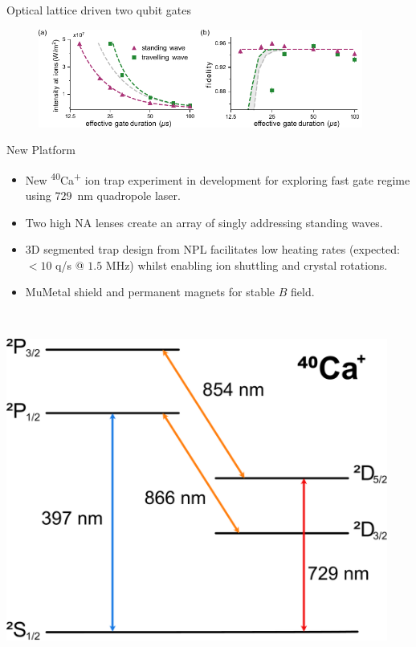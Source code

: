 \documentclass[final]{beamer}
\begin{document}
\begin{frame}{}
\begin{center}
\begin{columns}[t]
\begin{column}{0.49\textwidth}
\begin{alertblock}{Optical lattice driven two qubit gates}
\begin{figure}
        \includegraphics[width=0.95\textwidth]{./figs/two_qubit_gate_figure_h.pdf}
      \end{figure}
    \end{alertblock}


    \begin{alertblock}{New Platform}
      \begin{minipage}{0.58\textwidth}
      \begin{itemize}
      \item New \textsuperscript{40}Ca\textsuperscript{+} ion trap experiment in development for exploring fast
        gate regime using $729$~nm quadropole laser.
      \item Two high NA lenses create an array of singly
        addressing standing waves.
      \item 3D segmented trap design from NPL facilitates low heating
        rates (expected: $<10$ q/s @ $1.5$ MHz) whilst enabling ion shuttling and crystal rotations.
      \item MuMetal shield and permanent magnets for stable $B$ field.
      \end{itemize}
      \end{minipage}
      ~~
      \begin{minipage}{0.35\textwidth}
      \includegraphics[width=0.94\textwidth]{./figs/calcium_struct.pdf}
      \end{minipage}


\end{alertblock}
\end{column}
\end{columns}
\end{center}
\end{frame}
\end{document}
